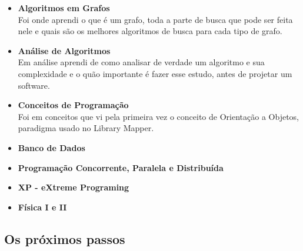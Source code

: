 \documentclass[a4paper,10pt]{article}
\begin{document}
\begin{itemize}
	\item{\bf{Algoritmos em Grafos}}\\

	Foi onde aprendi o que é um grafo, toda a parte de busca que pode ser feita nele e quais são os melhores algoritmos de busca
	para cada tipo de grafo.

	\item{\bf{Análise de Algoritmos}}\\
	
	Em análise aprendi de como analisar de verdade um algoritmo e sua complexidade e o quão importante é fazer esse estudo, 
	antes de projetar um software.

	\item{\bf{Conceitos de Programação}}\\

	Foi em conceitos que vi pela primeira vez o conceito de Orientação a Objetos, paradigma usado no Library Mapper.

	\item{\bf{Banco de Dados}}\\
	
	
	\item{\bf{Programação Concorrente, Paralela e Distribuída}}\\
	\item{\bf{XP - eXtreme Programing}} \\
	\item{\bf{Física I e II}}  	\\
\end{itemize}	
  \subsection{Os próximos passos}
  
   
  
\end{document}
